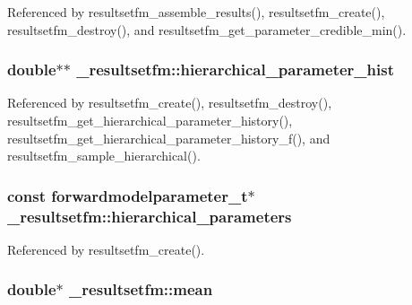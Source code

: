Referenced by resultsetfm\+\_\+assemble\+\_\+results(), resultsetfm\+\_\+create(), resultsetfm\+\_\+destroy(), and resultsetfm\+\_\+get\+\_\+parameter\+\_\+credible\+\_\+min().

\subsubsection[{\texorpdfstring{hierarchical\+\_\+parameter\+\_\+hist}{hierarchical_parameter_hist}}]{\setlength{\rightskip}{0pt plus 5cm}double$\ast$$\ast$ \+\_\+resultsetfm\+::hierarchical\+\_\+parameter\+\_\+hist}\hypertarget{struct__resultsetfm_ad2aede9c02fae9e251496c4be6296e88}{}\label{struct__resultsetfm_ad2aede9c02fae9e251496c4be6296e88}


Referenced by resultsetfm\+\_\+create(), resultsetfm\+\_\+destroy(), resultsetfm\+\_\+get\+\_\+hierarchical\+\_\+parameter\+\_\+history(), resultsetfm\+\_\+get\+\_\+hierarchical\+\_\+parameter\+\_\+history\+\_\+f(), and resultsetfm\+\_\+sample\+\_\+hierarchical().

\subsubsection[{\texorpdfstring{hierarchical\+\_\+parameters}{hierarchical_parameters}}]{\setlength{\rightskip}{0pt plus 5cm}const {\bf forwardmodelparameter\+\_\+t}$\ast$ \+\_\+resultsetfm\+::hierarchical\+\_\+parameters}\hypertarget{struct__resultsetfm_aad84bea0e2766ac2bf4dc6be83abe897}{}\label{struct__resultsetfm_aad84bea0e2766ac2bf4dc6be83abe897}


Referenced by resultsetfm\+\_\+create().

\subsubsection[{\texorpdfstring{mean}{mean}}]{\setlength{\rightskip}{0pt plus 5cm}double$\ast$ \+\_\+resultsetfm\+::mean}\hypertarget{struct__resultsetfm_a72335d980019201659b3751f2da0e902}{}\label{struct__resultsetfm_a72335d980019201659b3751f2da0e902}



